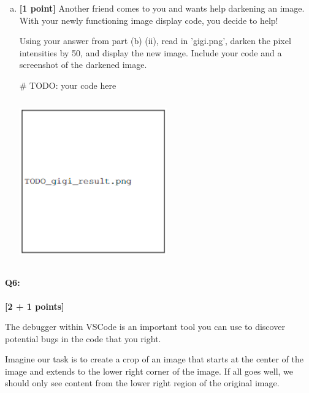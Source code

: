 \documentclass[11pt]{article}
\begin{document}
\begin{enumerate} [(a)]
\item \textbf{[1 point]} Another friend comes to you and wants help darkening an image. With your newly functioning image display code, you decide to help!
\begin{tcolorbox}[colback=orange!5!white,colframe=orange!75!black]
Using your answer from part (b) (ii), read in 'gigi.png', darken the pixel intensities by 50, and display the new image. Include your code and a screenshot of the darkened image.
\end{tcolorbox}

\begin{tcolorbox}[colback=white!5!white,colframe=green!75!black,height fill]
    \begin{python}
    # TODO: your code here
    \end{python}
    
    \includegraphics[width=0.5\textwidth,height=7cm,keepaspectratio]{images/TODO_gigi_result.png}

\end{tcolorbox}
\end{enumerate}



\pagebreak
\paragraph{Q6:} \textbf{[2 + 1 points]}

The debugger within VSCode is an important tool you can use to discover potential bugs in the code that you right.

Imagine our task is to create a crop of an image that starts at the center of the image and extends to the lower right corner of the image. If all goes well, we should only see content from the lower right region of the original image.
\end{document}
